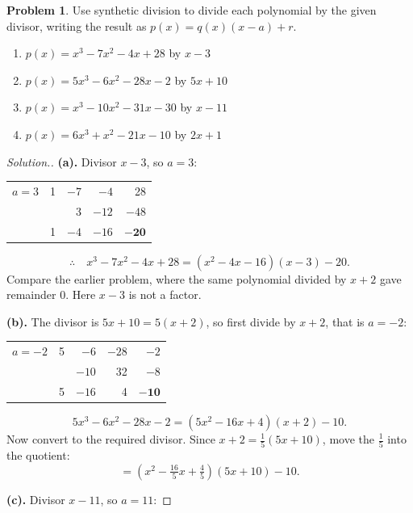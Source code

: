 \documentclass[11pt,a4paper]{article}
\theoremstyle{definition}
\newtheorem{problemx}{Problem}[section]
\newenvironment{problem}{\begin{problemx}}{\end{problemx}}
\newenvironment{solution}
  {\renewcommand{\qedsymbol}{}\begin{proof}[\textit{Solution}.]}
  {\end{proof}}
\begin{document}
\begin{problem}
Use synthetic division to divide each polynomial by the given divisor, writing the
result as $p(x)=q(x)(x-a)+r$.
\begin{enumerate}
\item[(a).] $p(x)=x^3-7x^2-4x+28$ by $x-3$
\item[(b).] $p(x)=5x^3-6x^2-28x-2$ by $5x+10$
\item[(c).] $p(x)=x^3-10x^2-31x-30$ by $x-11$
\item[(d).] $p(x)=6x^3+x^2-21x-10$ by $2x+1$
\end{enumerate}
\end{problem}

\begin{solution}
\textbf{(a).} Divisor $x-3$, so $a=3$:

\begin{table}[H]
\centering
\begin{tabular}{|c|r r r r|}
\hline
$a=3$ & 1 & $-7$ & $-4$ & 28\\
      &   & 3 & $-12$ & $-48$\\
\hline
      & 1 & $-4$ & $-16$ & $\mathbf{-20}$\\
\hline
\end{tabular}
\end{table}

$$\therefore\quad x^3-7x^2-4x+28=\left(x^2-4x-16\right)(x-3)-20.$$
Compare the earlier problem, where the same polynomial divided by $x+2$ gave remainder $0$. Here
$x-3$ is not a factor.

\textbf{(b).} The divisor is $5x+10=5(x+2)$, so first divide by $x+2$, that is $a=-2$:

\begin{table}[H]
\centering
\begin{tabular}{|c|r r r r|}
\hline
$a=-2$ & 5 & $-6$ & $-28$ & $-2$\\
       &   & $-10$ & 32 & $-8$\\
\hline
       & 5 & $-16$ & 4 & $\mathbf{-10}$\\
\hline
\end{tabular}
\end{table}

$$5x^3-6x^2-28x-2=\left(5x^2-16x+4\right)(x+2)-10.$$
Now convert to the required divisor. Since $x+2=\frac{1}{5}(5x+10)$, move the
$\frac{1}{5}$ into the quotient:
$$=\left(x^2-\tfrac{16}{5}x+\tfrac{4}{5}\right)(5x+10)-10.$$

\textbf{(c).} Divisor $x-11$, so $a=11$:


\end{solution}
\end{document}
